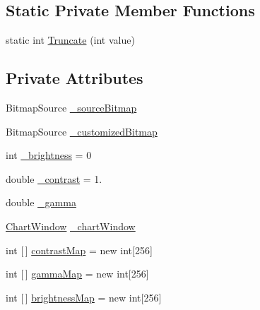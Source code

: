 \subsection*{Static Private Member Functions}
\begin{DoxyCompactItemize}
\item 
static int \mbox{\hyperlink{class_grafika_proj_1_1_image_customizator_abec25ea8e460fc27087af9a04f02a5d5}{Truncate}} (int value)
\end{DoxyCompactItemize}
\subsection*{Private Attributes}
\begin{DoxyCompactItemize}
\item 
Bitmap\+Source \mbox{\hyperlink{class_grafika_proj_1_1_image_customizator_acc294901a465ae038fbac2f51e430698}{\+\_\+source\+Bitmap}}
\item 
Bitmap\+Source \mbox{\hyperlink{class_grafika_proj_1_1_image_customizator_aac8f2f701dfab0795a647e2937db0258}{\+\_\+customized\+Bitmap}}
\item 
int \mbox{\hyperlink{class_grafika_proj_1_1_image_customizator_a707e2e0c8bccf20084b8f57939f14eff}{\+\_\+brightness}} = 0
\item 
double \mbox{\hyperlink{class_grafika_proj_1_1_image_customizator_a505b2dec94e23a2fdcf114789dbdb71f}{\+\_\+contrast}} = 1.
\item 
double \mbox{\hyperlink{class_grafika_proj_1_1_image_customizator_a62906e53ada3c6529eb7d512b88ffeb7}{\+\_\+gamma}}
\item 
\mbox{\hyperlink{class_grafika_proj_1_1_chart_window}{Chart\+Window}} \mbox{\hyperlink{class_grafika_proj_1_1_image_customizator_a2c86cd312aba1f0c431edef0cc8b4f23}{\+\_\+chart\+Window}}
\item 
int \mbox{[}$\,$\mbox{]} \mbox{\hyperlink{class_grafika_proj_1_1_image_customizator_a0ba86bb8684bc99b197ebd3346f532db}{contrast\+Map}} = new int\mbox{[}256\mbox{]}
\item 
int \mbox{[}$\,$\mbox{]} \mbox{\hyperlink{class_grafika_proj_1_1_image_customizator_a5e36e80e5d2060ad43ada320af49954c}{gamma\+Map}} = new int\mbox{[}256\mbox{]}
\item 
int \mbox{[}$\,$\mbox{]} \mbox{\hyperlink{class_grafika_proj_1_1_image_customizator_acd26b1c687e2c00265dec2b927e57613}{brightness\+Map}} = new int\mbox{[}256\mbox{]}
\end{DoxyCompactItemize}


